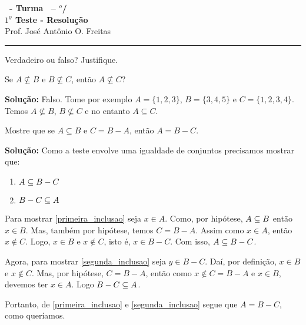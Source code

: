 \documentclass[12pt]{exam}
\begin{document}
\begin{center}
{\Large\bf \disciplina\ - Turma \turma\ -- \semestre$^{o}$/\ano} \\ \vspace{9pt} {\large\bf
$1^{\underline{o}}$ Teste - Resolu\c{c}\~ao}\\
\vspace{9pt} Prof. Jos{\'e} Ant{\^o}nio O. Freitas
\end{center}
\hrule

\vspace{.6cm}


\vspace{.6cm}

\questao Verdadeiro ou falso? Justifique.
\begin{center}
    Se $A \nsubseteq B$ e $B \nsubseteq C$, ent\~ao $A \nsubseteq C$?
\end{center}

\noindent\textbf{Solu\c{c}\~ao:} Falso. Tome por exemplo $A = \{1, 2, 3\}$, $B = \{3, 4, 5\}$ e $C = \{1, 2, 3, 4\}$. Temos $A \nsubseteq B$, $B \nsubseteq C$ e no entanto $A \subseteq C$.

\vspace{.5cm}

\questao Mostre que se $A \subseteq B$ e $C = B - A$, ent\~ao $A = B - C$.

\noindent\textbf{Solu\c{c}\~ao:} Como a teste envolve uma igualdade de conjuntos precisamos mostrar que:
\begin{enumerate}[label=({\roman*})]
    \item $A \subseteq B - C$\label{primeira_inclusao}
    \item $B - C \subseteq A$\label{segunda_inclusao}
\end{enumerate}

Para mostrar \ref{primeira_inclusao} seja $x \in A$. Como, por hipótese, $A \subseteq B$ então $x \in B$. Mas, também por hipótese, temos $C = B - A$. Assim como $x \in A$, então $x \notin C$. Logo, $x \in B$ e $x \notin C$, isto é, $x \in B - C$. Com isso, $A \subseteq B - C$.

Agora, para mostrar \ref{segunda_inclusao} seja $y \in B - C$. Daí, por definição, $x \in B$ e $x \notin C$. Mas, por hipótese, $C = B - A$, então como $x \notin C = B - A$ e $x \in B$, devemos ter $x \in A$. Logo $B - C \subseteq A$.

Portanto, de \ref{primeira_inclusao} e \ref{segunda_inclusao} segue que $A = B - C$, como queríamos.
\end{document}
